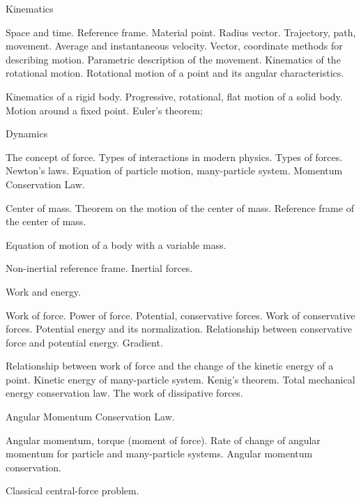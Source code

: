 \documentclass{rnp}
\begin{document}
\begin{Rozdil}
\item Kinematics
	\begin{Rozdil}
	\item  Space and time. Reference frame. Material point. Radius vector. Trajectory, path, movement. Average and instantaneous velocity. Vector, coordinate methods for describing motion. Parametric description of the movement. Kinematics of the rotational motion. Rotational motion of a point and its angular characteristics.
	\item Kinematics of a rigid body. Progressive, rotational, flat motion of a solid body. Motion around a fixed point. Euler's theorem;
	\end{Rozdil}
\item Dynamics
	\begin{Rozdil}
	\item The concept of force. Types of interactions in modern physics. Types of forces. Newton's laws. Equation of particle motion, many-particle system. Momentum Conservation Law.
	\item Center of mass. Theorem on the motion of the center of mass. Reference frame of the center of mass. 
	\item Equation of motion of a body with a variable mass.
	\item Non-inertial reference frame. Inertial forces.
	\end{Rozdil}
\item Work and energy.
	\begin{Rozdil}
	\item Work of force. Power of force. Potential, conservative forces. Work of conservative forces. Potential energy and its normalization. Relationship between conservative force and potential energy. Gradient.
	\item Relationship between work of force and the change of the kinetic energy of a point. Kinetic energy of many-particle system. Kenig's theorem. Total mechanical energy conservation law. The work of dissipative forces.
	\end{Rozdil}
\item Angular Momentum Conservation Law.
	\begin{Rozdil}
	\item 	Angular momentum, torque (moment of force). Rate of change of angular momentum for particle and many-particle systems. Angular momentum conservation.
	\end{Rozdil}
\item Classical central-force problem.

\end{Rozdil}
\end{document}
